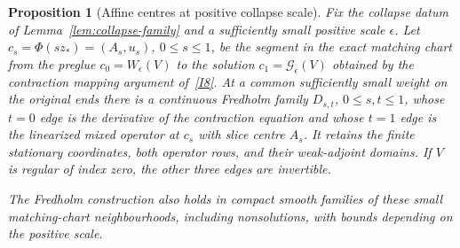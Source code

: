 \documentclass[11pt]{amsart}
\newtheorem{proposition}[theorem]{Proposition}
\theoremstyle{definition}
\theoremstyle{remark}
\theoremstyle{plain}
\numberwithin{equation}{section}
\begin{document}
\begin{proposition}[Affine centres at positive collapse scale]
\label{prop:affine-square}
Fix the collapse datum of Lemma~\ref{lem:collapse-family} and a
sufficiently small positive scale $\epsilon$. Let
$c_s=\Phi(sz_*)=(A_s,u_s)$, $0\leq s\leq1$, be the segment in the exact
matching chart from the preglue $c_0=W_\epsilon(V)$ to the solution
$c_1=\mathcal G_\epsilon(V)$ obtained by the contraction mapping argument
of~\ref{I8}. At a common sufficiently small weight on the original
ends there is a continuous Fredholm family $D_{s,t}$, $0\leq s,t\leq1$,
whose $t=0$ edge is the derivative of the contraction equation and whose
$t=1$ edge is the linearized mixed operator at $c_s$ with slice centre
$A_s$. It retains the finite stationary coordinates, both operator rows,
and their weak-adjoint domains. If $V$ is regular of index zero, the
other three edges are invertible.

The Fredholm construction also holds in compact smooth families of these
small matching-chart neighbourhoods, including nonsolutions, with bounds
depending on the positive scale.
\end{proposition}
\end{document}
